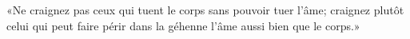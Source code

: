 \encetemps \jesusdisciples
	«Ne craignez pas ceux qui tuent le corps sans pouvoir tuer l’âme;
	craignez plutôt celui qui peut faire périr dans la géhenne
		l’âme aussi bien que le corps.»
